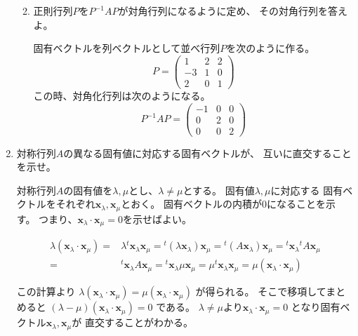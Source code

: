 \documentclass[10pt,b5paper]{ltjsarticle}
\begin{document}
\begin{enumerate}
\begin{enumerate}
              \hrulefill
        \item 正則行列$P$を$P^{-1}AP$が対角行列になるように定め、
              その対角行列を答えよ。

              \dotfill

              固有ベクトルを列ベクトルとして並べ行列$P$を次のように作る。
              \begin{equation}
               P=\begin{pmatrix} 1&2&2\\ -3&1&0\\ 2&0&1\end{pmatrix}
              \end{equation}
              この時、対角化行列は次のようになる。
              \begin{equation}
               P^{-1}AP=\begin{pmatrix} -1&0&0\\ 0&2&0\\ 0&0&2\end{pmatrix}
              \end{equation}
       \end{enumerate}
       \hrulefill
 \item 対称行列$A$の異なる固有値に対応する固有ベクトルが、
       互いに直交することを示せ。

       \dotfill

       対称行列$A$の固有値を$\lambda, \mu$とし、$\lambda\ne\mu$とする。
       固有値$\lambda, \mu$に対応する
       固有ベクトルをそれぞれ$\bm{x}_{\lambda}, \bm{x}_{\mu}$とおく。
       固有ベクトルの内積が0になることを示す。
       つまり、$\bm{x}_{\lambda}\cdot\bm{x}_{\mu}=0$を示せばよい。

       \begin{align}
        \lambda (\bm{x}_{\lambda}\cdot\bm{x}_{\mu})
        =& \lambda {}^{t}\bm{x}_{\lambda}\bm{x}_{\mu}
        = {}^{t}(\lambda\bm{x}_{\lambda})\bm{x}_{\mu}
        = {}^{t}(A\bm{x}_{\lambda})\bm{x}_{\mu}
        = {}^{t}\bm{x}_{\lambda}{}^{t}A\bm{x}_{\mu}\\
        =& {}^{t}\bm{x}_{\lambda}A\bm{x}_{\mu}
        = {}^{t}\bm{x}_{\lambda}\mu\bm{x}_{\mu}
        = \mu{}^{t}\bm{x}_{\lambda}\bm{x}_{\mu}
        = \mu (\bm{x}_{\lambda}\cdot\bm{x}_{\mu})
       \end{align}

       この計算より
       $\lambda (\bm{x}_{\lambda}\cdot\bm{x}_{\mu})
       = \mu (\bm{x}_{\lambda}\cdot\bm{x}_{\mu})$
       が得られる。
       そこで移項してまとめると
       $(\lambda-\mu) (\bm{x}_{\lambda}\cdot\bm{x}_{\mu})=0$
       である。
       $\lambda\ne\mu$より$\bm{x}_{\lambda}\cdot\bm{x}_{\mu}=0$
       となり固有ベクトル$\bm{x}_{\lambda}, \bm{x}_{\mu}$が
       直交することがわかる。
\end{enumerate}
\end{document}
